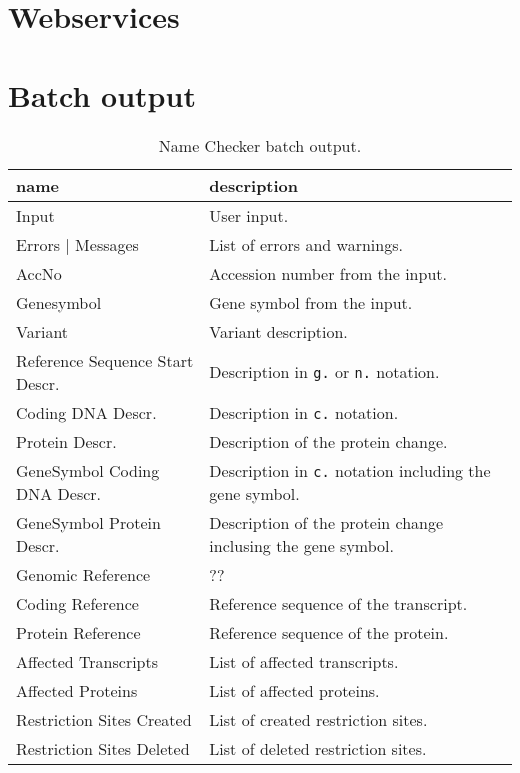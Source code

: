 \documentclass{article}
\begin{document}
{}


\appendix

\section{Webservices} \label{sec:webservices}

\section{Batch output} \label{sec:batchoutput}
\begin{table}[h]
  \caption{Name Checker batch output.}
  \label{tab:namecheckbatch}
  \begin{center}
    \begin{tabular}{l|l}
      name                             & description\\
      \hline
      Input                            & User input.\\
      Errors | Messages                & List of errors and warnings.\\
      AccNo                            & Accession number from the input.\\
      Genesymbol                       & Gene symbol from the input.\\
      Variant                          & Variant description.\\
      Reference Sequence Start Descr.  & Description in \texttt{g.} or
        \texttt{n.} notation.\\
      Coding DNA Descr.                & Description in \texttt{c.} notation.\\
      Protein Descr.                   & Description of the protein change.\\
      GeneSymbol Coding DNA Descr.     & Description in \texttt{c.} notation
        including the gene symbol.\\
      GeneSymbol Protein Descr.        & Description of the protein change
        inclusing the gene symbol.\\
      Genomic Reference                & ??\\
      Coding Reference                 & Reference sequence of the
        transcript.\\
      Protein Reference                & Reference sequence of the protein.\\
      Affected Transcripts             & List of affected transcripts.\\
      Affected Proteins                & List of affected proteins.\\
      Restriction Sites Created        & List of created restriction sites.\\
      Restriction Sites Deleted        & List of deleted restriction sites.\\
    \end{tabular}
  \end{center}
\end{table}
\end{document}
